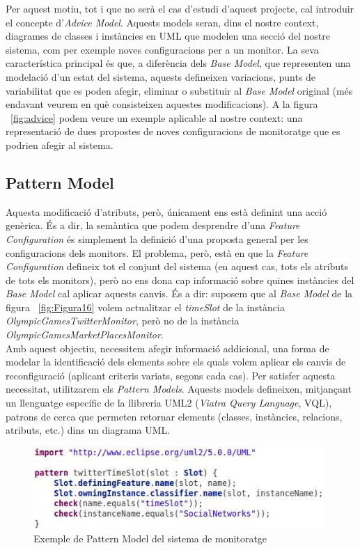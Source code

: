 Per aquest motiu, tot i que no serà el cas d'estudi d'aquest projecte, cal introduir el concepte d'\textit{Advice Model}. Aquests models seran, dins el nostre context, diagrames de classes i instàncies en UML que modelen una secció del nostre sistema, com per exemple noves configuracions per a un monitor. La seva característica principal és que, a diferència dels \textit{Base Model}, que representen una modelació d'un estat del sistema, aquests defineixen variacions, punts de variabilitat que es poden afegir, eliminar o substituir al \textit{Base Model} original (més endavant veurem en què consisteixen aquestes modificacions). A la figura ~\ref{fig:advice} podem veure un exemple aplicable al nostre context: una representació de dues propostes de noves configuracions de monitoratge que es podrien afegir al sistema.

\subsection{Pattern Model}

Aquesta modificació d'atributs, però, únicament ens està definint una acció genèrica. És a dir, la semàntica que podem desprendre d'una \textit{Feature Configuration} és simplement la definició d'una proposta general per les configuracions dels monitors. El problema, però, està en que la \textit{Feature Configuration} defineix tot el conjunt del sistema (en aquest cas, tots els atributs de tots els monitors), però no ens dona cap informació sobre quines instàncies del \textit{Base Model} cal aplicar aquests canvis. És a dir: suposem que al \textit{Base Model} de la figura ~\ref{fig:Figura16} volem actualitzar el \textit{timeSlot} de la instància \textit{OlympicGamesTwitterMonitor}, però no de la instància \textit{OlympicGamesMarketPlacesMonitor}.\\

Amb aquest objectiu, necessitem afegir informació addicional, una forma de modelar la identificació dels elements sobre els quals volem aplicar els canvis de reconfiguració (aplicant criteris variats, segons cada cas). Per satisfer aquesta necessitat, utilitzarem els \textit{Pattern Models}. Aquests models defineixen, mitjançant un llenguatge específic de la llibreria UML2 (\textit{Viatra Query Language}, VQL), patrons de cerca que permeten retornar elements (classes, instàncies, relacions, atributs, etc.) dins un diagrama UML\cite{vql}.\\ 

\begin{figure}
\centering
\includegraphics[width=11cm]{Figures/Figure19}
\decoRule
\caption{Exemple de Pattern Model del sistema de monitoratge}
\label{fig:Figura19}
\end{figure}

